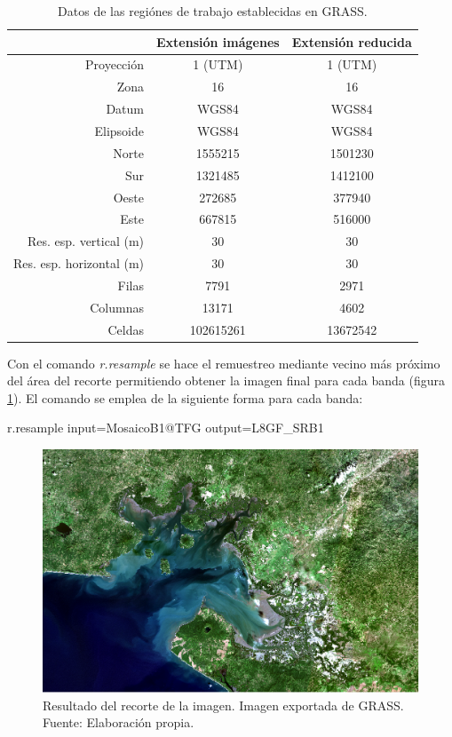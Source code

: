 \begin{table}[ht]
	\centering
	\caption[Datos de las regiónes de trabajo]{Datos de las regiónes de trabajo establecidas en GRASS.}
	\begin{tabular}{|r|c|c|}
	\hline
	& Extensión imágenes & Extensión reducida\\
	\hline
	Proyección & 1 (UTM) & 1 (UTM) \\
	\hline
	Zona & 16 & 16 \\
	\hline
	Datum & WGS84 & WGS84 \\
	\hline
	Elipsoide & WGS84 & WGS84 \\
	\hline
	Norte & 1555215 &1501230 \\
	\hline
	Sur & 1321485 & 1412100 \\
	\hline
	Oeste & 272685 & 377940 \\
	\hline
	Este & 667815 & 516000 \\
	\hline
	Res. esp. vertical (m) & 30 & 30 \\
	\hline
	Res. esp. horizontal (m) & 30 & 30\\
	\hline
	Filas & 7791 & 2971 \\
	\hline
	Columnas & 13171 & 4602 \\
	\hline
	Celdas & 102615261 & 13672542 \\
	\hline
	\end{tabular}
	\label{tab:region}
\end{table}

Con el comando \textit{r.resample} se hace el remuestreo mediante vecino más próximo del área del recorte permitiendo obtener la imagen final para cada banda (figura \ref{fig:recorte}). El comando se emplea de la siguiente forma para cada banda:

\begin{center}
\begin{boxedverbatim}
	r.resample input=MosaicoB1@TFG output=L8GF_SRB1
\end{boxedverbatim}
\end{center}

\begin{figure}
	\centering
	\includegraphics[width=0.8\linewidth]{./Imagenes/Recorte.eps}
	\caption[Recorte de imagen Landsat]{Resultado del recorte de la imagen. Imagen exportada de GRASS. Fuente: Elaboración propia.}
	\label{fig:recorte}
\end{figure}


